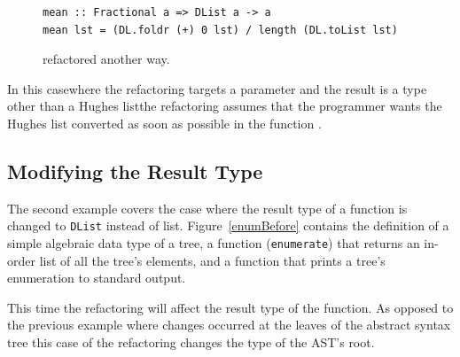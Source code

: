 \begin{figure}[t]
\DIFdelbeginFL %
\DIFdelendFL \DIFaddbeginFL \begin{lstlisting}
mean :: Fractional a => DList a -> a
mean lst = (DL.foldr (+) 0 lst) / length (DL.toList lst)
\end{lstlisting}  
\DIFaddendFL \caption{\DIFdelbeginFL \texttt{} %
\DIFdelendFL \DIFaddbeginFL \texttt{} \DIFaddendFL refactored another way.}
\DIFdelbeginFL %
\DIFdelendFL \DIFaddbeginFL \label{meanRef2}
\DIFaddendFL \end{figure}  

In this case\DIFaddbegin \DIFadd{, }\DIFaddend where the refactoring targets a parameter and the \DIFdelbegin {}\DIFdelend result is a type other than a Hughes list\DIFaddbegin \DIFadd{, }\DIFaddend the refactoring assumes that the programmer wants the Hughes list converted as soon as possible in the function \DIFaddbegin {}\texttt{} \DIFaddend . 

\subsection{Modifying the Result Type}
\label{hugesListResTy}

The second example covers the case where the result type of a function is changed to \texttt{DList} instead of list. Figure~\ref{enumBefore} contains the definition of a simple algebraic data type of a tree, a function (\texttt{enumerate}) that returns an in-order list of all the tree's elements, and a function that prints a tree's enumeration to standard output. 

This time the refactoring will affect the result type of the function. As opposed to the previous example where changes occurred at the leaves of the abstract syntax tree this case of the refactoring changes the type of the AST's root. 

